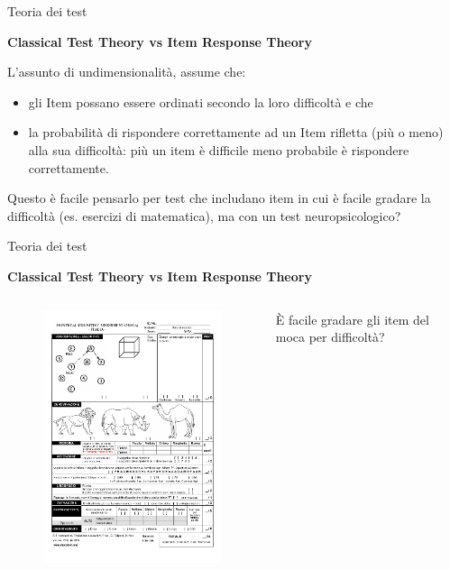 \documentclass[
  ignorenonframetext,
]{beamer}
\begin{document}
\begin{frame}{Teoria dei test}
\label{teoria-dei-test-9}
\begin{center}
  \textbf{Classical Test Theory vs Item Response Theory}
\end{center}

L'assunto di undimensionalità, assume che:

\begin{itemize}[<*>] 
\item gli Item possano essere ordinati secondo la loro difficoltà e che
\item la probabilità di rispondere correttamente ad un Item rifletta (più o meno) alla sua difficoltà: più un item è difficile meno probabile è rispondere correttamente.
\end{itemize}

Questo è facile pensarlo per test che includano item in cui è facile
gradare la difficoltà (es. esercizi di matematica), ma con un test
neuropsicologico?
\end{frame}

\begin{frame}{Teoria dei test}
\label{teoria-dei-test-10}
\begin{center}
  \textbf{Classical Test Theory vs Item Response Theory}
\end{center}
\vspace{2em}

\begin{columns}
  \begin{column}{0.5\textwidth}
    \begin{figure}
    \includegraphics[scale=0.5]{Figures/MOCA.png}
    \end{figure}
  \end{column}
  \begin{column}{0.5\textwidth}
    È facile gradare gli item del moca per difficoltà?
  \end{column}
\end{columns}
\end{frame}
\end{document}
